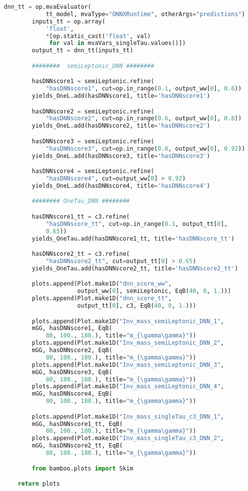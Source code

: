 \begin{lstlisting}[language=Python, caption=Python module of the analysis used in Bamboo framework, label={bamboocode}]
        dnn_tt = op.mvaEvaluator(
            tt_model, mvaType="ONNXRuntime", otherArgs="predictions")
        inputs_tt = op.array(
            'float',
            *[op.static_cast('float', val)
             for val in mvaVars_singleTau.values()])
        output_tt = dnn_tt(inputs_tt)

        ########  semiLeptonic_DNN ########

        hasDNNscore1 = semiLeptonic.refine(
            "hasDNNscore1", cut=op.in_range(0.1, output_ww[0], 0.6))
        yields_OneL.add(hasDNNscore1, title='hasDNNscore1')

        hasDNNscore2 = semiLeptonic.refine(
            "hasDNNscore2", cut=op.in_range(0.6, output_ww[0], 0.8))
        yields_OneL.add(hasDNNscore2, title='hasDNNscore2')

        hasDNNscore3 = semiLeptonic.refine(
            "hasDNNscore3", cut=op.in_range(0.8, output_ww[0], 0.92))
        yields_OneL.add(hasDNNscore3, title='hasDNNscore3')

        hasDNNscore4 = semiLeptonic.refine(
            "hasDNNscore4", cut=output_ww[0] > 0.92)
        yields_OneL.add(hasDNNscore4, title='hasDNNscore4')

        ######## OneTau_DNN ########

        hasDNNscore1_tt = c3.refine(
            "hasDNNscore_tt", cut=op.in_range(0.1, output_tt[0], 
            0.65))
        yields_OneTau.add(hasDNNscore1_tt, title='hasDNNscore_tt')

        hasDNNscore2_tt = c3.refine(
            "hasDNNscore2_tt", cut=output_tt[0] > 0.65)
        yields_OneTau.add(hasDNNscore2_tt, title='hasDNNscore2_tt')

        plots.append(Plot.make1D("dnn_score_ww",
                     output_ww[0], semiLeptonic, EqB(40, 0, 1.)))
        plots.append(Plot.make1D("dnn_score_tt",
                     output_tt[0], c3, EqB(40, 0, 1.)))

        plots.append(Plot.make1D("Inv_mass_semiLeptonic_DNN_1",
        mGG, hasDNNscore1, EqB(
            80, 100., 180.), title="m_{\gamma\gamma}"))
        plots.append(Plot.make1D("Inv_mass_semiLeptonic_DNN_2",
        mGG, hasDNNscore2, EqB(
            80, 100., 180.), title="m_{\gamma\gamma}"))
        plots.append(Plot.make1D("Inv_mass_semiLeptonic_DNN_3",
        mGG, hasDNNscore3, EqB(
            80, 100., 180.), title="m_{\gamma\gamma}"))
        plots.append(Plot.make1D("Inv_mass_semiLeptonic_DNN_4",
        mGG, hasDNNscore4, EqB(
            80, 100., 180.), title="m_{\gamma\gamma}"))

        plots.append(Plot.make1D("Inv_mass_singleTau_c3_DNN_1",
        mGG, hasDNNscore1_tt, EqB(
            80, 100., 180.), title="m_{\gamma\gamma}"))
        plots.append(Plot.make1D("Inv_mass_singleTau_c3_DNN_2",
        mGG, hasDNNscore2_tt, EqB(
            80, 100., 180.), title="m_{\gamma\gamma}"))

        from bamboo.plots import Skim

    return plots

\end{lstlisting}